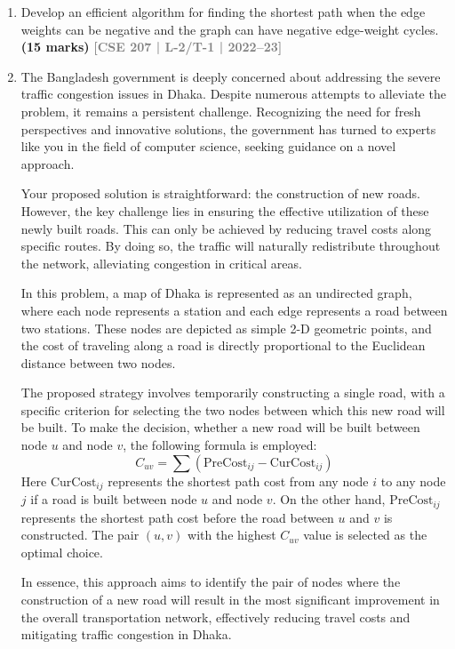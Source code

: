 \documentclass[12pt]{article}
\newcommand{\yr}[1]{\hfill\textcolor{gray}{\small\textbf{[#1]}}}
\newcommand{\mk}[1]{\textcolor{orange!70!black}{\small\textbf{(#1 marks)}}}
\begin{document}
\begin{enumerate}
\item Develop an efficient algorithm for finding the shortest path when the edge weights can be negative and the graph can have negative edge-weight cycles.
\mk{15} \yr{CSE 207 | L-2/T-1 | 2022--23}


\item The Bangladesh government is deeply concerned about addressing the severe traffic congestion issues in Dhaka. Despite numerous attempts to alleviate the problem, it remains a persistent challenge. Recognizing the need for fresh perspectives and innovative solutions, the government has turned to experts like you in the field of computer science, seeking guidance on a novel approach.

Your proposed solution is straightforward: the construction of new roads. However, the key challenge lies in ensuring the effective utilization of these newly built roads. This can only be achieved by reducing travel costs along specific routes. By doing so, the traffic will naturally redistribute throughout the network, alleviating congestion in critical areas.

In this problem, a map of Dhaka is represented as an undirected graph, where each node represents a station and each edge represents a road between two stations. These nodes are depicted as simple 2-D geometric points, and the cost of traveling along a road is directly proportional to the Euclidean distance between two nodes.

The proposed strategy involves temporarily constructing a single road, with a specific criterion for selecting the two nodes between which this new road will be built. To make the decision, whether a new road will be built between node $u$ and node $v$, the following formula is employed:
\[
C_{uv} = \sum \left( \text{PreCost}_{ij} - \text{CurCost}_{ij} \right)
\]
Here $\text{CurCost}_{ij}$ represents the shortest path cost from any node $i$ to any node $j$ if a road is built between node $u$ and node $v$. On the other hand, $\text{PreCost}_{ij}$ represents the shortest path cost before the road between $u$ and $v$ is constructed. The pair $(u,v)$ with the highest $C_{uv}$ value is selected as the optimal choice.

In essence, this approach aims to identify the pair of nodes where the construction of a new road will result in the most significant improvement in the overall transportation network, effectively reducing travel costs and mitigating traffic congestion in Dhaka.


\end{enumerate}
\end{document}
